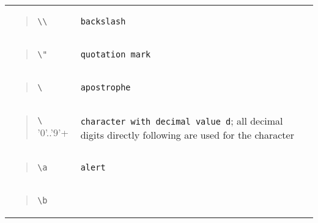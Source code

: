 \begin{longtable}[]{@{}ll@{}}
\begin{minipage}[t]{0.47\columnwidth}
\begin{quote}
\texttt{\textbackslash{}\textbackslash{}}
\end{quote}\strut
\end{minipage} & \begin{minipage}[t]{0.47\columnwidth}\raggedright
\texttt{backslash}\strut
\end{minipage}\tabularnewline
\begin{minipage}[t]{0.47\columnwidth}\raggedright
\begin{quote}
\texttt{\textbackslash{}"}
\end{quote}\strut
\end{minipage} & \begin{minipage}[t]{0.47\columnwidth}\raggedright
\texttt{quotation\ mark}\strut
\end{minipage}\tabularnewline
\begin{minipage}[t]{0.47\columnwidth}\raggedright
\begin{quote}
\texttt{\textbackslash{}\textquotesingle{}}
\end{quote}\strut
\end{minipage} & \begin{minipage}[t]{0.47\columnwidth}\raggedright
\texttt{apostrophe}\strut
\end{minipage}\tabularnewline
\begin{minipage}[t]{0.47\columnwidth}\raggedright
\begin{quote}
\texttt{\textbackslash{}} '0'..'9'+
\end{quote}\strut
\end{minipage} & \begin{minipage}[t]{0.47\columnwidth}\raggedright
\texttt{character\ with\ decimal\ value\ d}; all decimal digits directly
following are used for the character\strut
\end{minipage}\tabularnewline
\begin{minipage}[t]{0.47\columnwidth}\raggedright
\begin{quote}
\texttt{\textbackslash{}a}
\end{quote}\strut
\end{minipage} & \begin{minipage}[t]{0.47\columnwidth}\raggedright
\texttt{alert}\strut
\end{minipage}\tabularnewline
\begin{minipage}[t]{0.47\columnwidth}\raggedright
\begin{quote}
\texttt{\textbackslash{}b}
\end{quote}\strut

\end{minipage}
\end{longtable}

